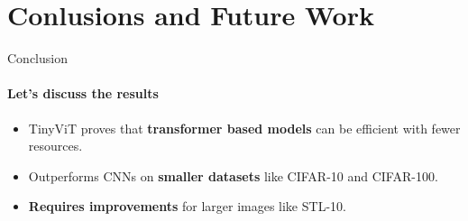 \section{Conlusions and Future Work}

\begin{frame}{Conclusion}
  \framesubtitle{Let's discuss the results}
  \begin{itemize}
    \item TinyViT proves that \textbf{transformer based models} can be efficient with fewer resources.
    \item Outperforms CNNs on \textbf{smaller datasets} like CIFAR-10 and CIFAR-100.
    \item \textbf{Requires improvements} for larger images like STL-10.
  \end{itemize}
\end{frame}

